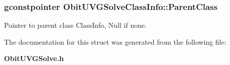 \subsubsection{\setlength{\rightskip}{0pt plus 5cm}gconstpointer {\bf Obit\-UVGSolve\-Class\-Info::Parent\-Class}}\label{structObitUVGSolveClassInfo_o3}


Pointer to parent class Class\-Info, Null if none. 



The documentation for this struct was generated from the following file:\begin{CompactItemize}
\item 
{\bf Obit\-UVGSolve.h}\end{CompactItemize}
